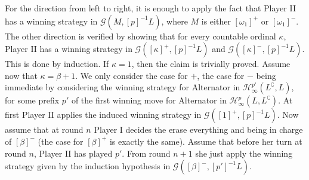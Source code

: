 For the direction from left to right, it is enough to apply the fact that %
Player II has a winning strategy in $\mathcal{G}(M, [p]^{-1}L)$, where $M$ is either $[\omega_1]^+$ or $[\omega_1]^-$. 
%
The other direction is verified by showing that for every countable ordinal $\kappa$, Player II has a winning strategy in $\mathcal{G}([\kappa]^+, [p]^{-1}L)$ and $\mathcal{G}([\kappa]^-, [p]^{-1}L)$.
This is done by induction. %
If $\kappa=1$, then the claim is trivially proved.
Assume now that $\kappa= \beta + 1$. We only consider the case for $+$, the case for $-$ being immediate  by considering the winning strategy for Alternator in $\mathcal{H}^{p'}_\infty(L^\complement, L)$, for some prefix $p'$ of the first winning move for Alternator in $\mathcal{H}^p_\infty(L, L^\complement)$. At first Player II applies the induced winning strategy in $\mathcal{G}([1]^+, [p]^{-1}L)$. Now assume that at round $n$ Player I decides the erase everything and being in charge of $[\beta]^-$ (the case for $[\beta]^+$ is exactly the same). Assume that before her turn at round $n$, Player II has played $p'$. From round $n+1$ she just apply the winning strategy given by the induction hypothesis in $\mathcal{G}([\beta]^-, [p']^{-1}L)$. 
